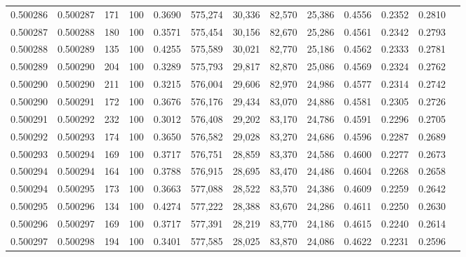 \begin{tabular}{rrrrrrrrrrrrr}
0.500286 & 0.500287 &   171 & 100 &                                     0.3690 & 575,274 &  30,336 &  82,570 &  25,386 & 0.4556 & 0.2352 & 0.2810 \\
0.500287 & 0.500288 &   180 & 100 &                                     0.3571 & 575,454 &  30,156 &  82,670 &  25,286 & 0.4561 & 0.2342 & 0.2793 \\
0.500288 & 0.500289 &   135 & 100 &                                     0.4255 & 575,589 &  30,021 &  82,770 &  25,186 & 0.4562 & 0.2333 & 0.2781 \\
0.500289 & 0.500290 &   204 & 100 &                                     0.3289 & 575,793 &  29,817 &  82,870 &  25,086 & 0.4569 & 0.2324 & 0.2762 \\
0.500290 & 0.500290 &   211 & 100 &                                     0.3215 & 576,004 &  29,606 &  82,970 &  24,986 & 0.4577 & 0.2314 & 0.2742 \\
0.500290 & 0.500291 &   172 & 100 &                                     0.3676 & 576,176 &  29,434 &  83,070 &  24,886 & 0.4581 & 0.2305 & 0.2726 \\
0.500291 & 0.500292 &   232 & 100 &                                     0.3012 & 576,408 &  29,202 &  83,170 &  24,786 & 0.4591 & 0.2296 & 0.2705 \\
0.500292 & 0.500293 &   174 & 100 &                                     0.3650 & 576,582 &  29,028 &  83,270 &  24,686 & 0.4596 & 0.2287 & 0.2689 \\
0.500293 & 0.500294 &   169 & 100 &                                     0.3717 & 576,751 &  28,859 &  83,370 &  24,586 & 0.4600 & 0.2277 & 0.2673 \\
0.500294 & 0.500294 &   164 & 100 &                                     0.3788 & 576,915 &  28,695 &  83,470 &  24,486 & 0.4604 & 0.2268 & 0.2658 \\
0.500294 & 0.500295 &   173 & 100 &                                     0.3663 & 577,088 &  28,522 &  83,570 &  24,386 & 0.4609 & 0.2259 & 0.2642 \\
0.500295 & 0.500296 &   134 & 100 &                                     0.4274 & 577,222 &  28,388 &  83,670 &  24,286 & 0.4611 & 0.2250 & 0.2630 \\
0.500296 & 0.500297 &   169 & 100 &                                     0.3717 & 577,391 &  28,219 &  83,770 &  24,186 & 0.4615 & 0.2240 & 0.2614 \\
0.500297 & 0.500298 &   194 & 100 &                                     0.3401 & 577,585 &  28,025 &  83,870 &  24,086 & 0.4622 & 0.2231 & 0.2596 \\

\end{tabular}
